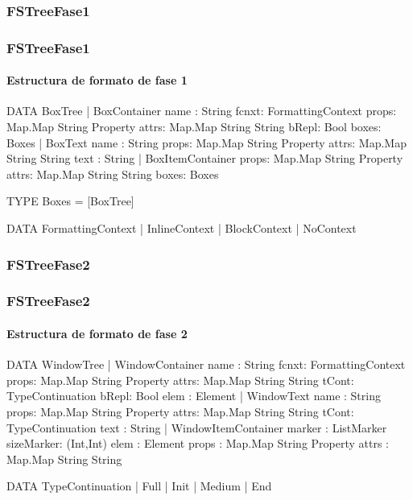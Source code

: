 \documentclass[12pt]{beamer}
\begin{document}
\subsubsection{FSTreeFase1}
\begin{frame}[fragile]
\frametitle{FSTreeFase1}
\framesubtitle{Estructura de formato de fase 1}
\begin{block}{}
\begin{ag}
DATA BoxTree
  | BoxContainer name : String
                 fcnxt: {FormattingContext}
                 props: {Map.Map String Property}
                 attrs: {Map.Map String String}
                 bRepl: Bool
                 boxes: Boxes
  | BoxText name : String
            props: {Map.Map String Property}
            attrs: {Map.Map String String}
            text : String
  | BoxItemContainer props: {Map.Map String Property}
                     attrs: {Map.Map String String}
                     boxes: Boxes

TYPE Boxes = [BoxTree]

DATA FormattingContext
  | InlineContext | BlockContext | NoContext
\end{ag}
\end{block}
\end{frame}

\subsubsection{FSTreeFase2}
\begin{frame}[fragile]
\frametitle{FSTreeFase2}
\framesubtitle{Estructura de formato de fase 2}
\begin{block}{}
\begin{ag}
DATA WindowTree
  | WindowContainer name : String
                    fcnxt: {FormattingContext}
                    props: {Map.Map String Property}
                    attrs: {Map.Map String String}
                    tCont: {TypeContinuation}
                    bRepl: Bool
                    elem : Element
  | WindowText name : String
               props: {Map.Map String Property}
               attrs: {Map.Map String String}
               tCont: {TypeContinuation}
               text : String
  | WindowItemContainer marker    : {ListMarker}
                        sizeMarker: {(Int,Int)}
                        elem      : Element
                        props     : {Map.Map String Property}
                        attrs     : {Map.Map String String}

DATA TypeContinuation 
  | Full  | Init  | Medium | End

\end{ag}
\end{block}
\end{frame}
\end{document}
